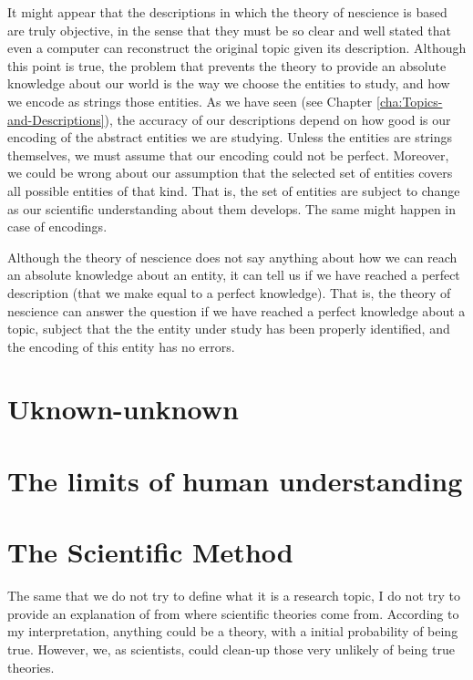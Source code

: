 It might appear that the descriptions in which the theory of nescience is based are truly objective, in the sense that they must be so clear and well stated that even a computer can reconstruct the original topic given its description. Although this point is true, the problem that prevents the theory to provide an absolute knowledge about our world is the way we choose the entities to study, and how we encode as strings those entities. As we have seen (see Chapter \ref{cha:Topics-and-Descriptions}), the accuracy of our descriptions depend on how good is our encoding of the abstract entities we are studying. Unless the entities are strings themselves, we must assume that our encoding could not be perfect. Moreover, we could be wrong about our assumption that the selected set of entities covers all possible entities of that kind. That is, the set of entities are subject to change as our scientific understanding about them develops. {\color{red} The same might happen in case of encodings.}

Although the theory of nescience does not say anything about how we can reach an absolute knowledge about an entity, it can tell us if we have reached a perfect description (that we make equal to a perfect knowledge). That is, the theory of nescience can answer the question if we have reached a perfect knowledge about a topic, subject that the the entity under study has been properly identified, and the encoding of this entity has no errors.

%
%
\section{Uknown-unknown}

%
%
\section{The limits of human understanding}

%
%
\section{The Scientific Method}

The same that we do not try to define what it is a research topic, I do not try to provide an explanation of from where scientific theories come from. According to my interpretation, anything could be a theory, with a initial probability of being true. However, we, as scientists, could clean-up those very unlikely of being true theories.

